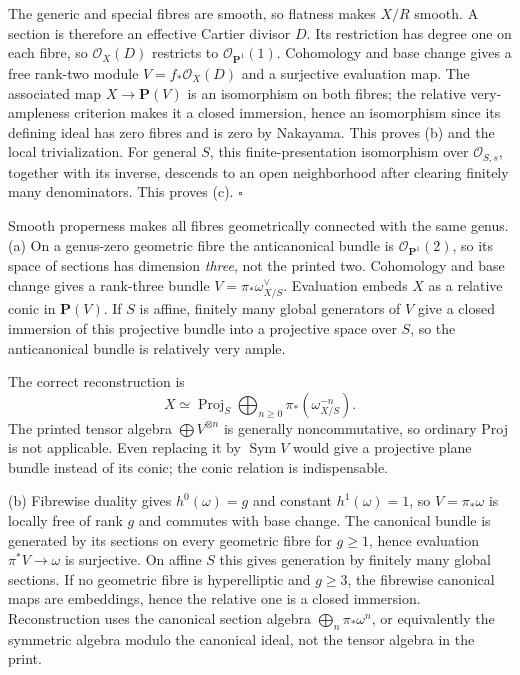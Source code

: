 \documentclass[11pt]{article}
\let\chapterexercise\exercise
\renewcommand{\exercise}[2]{\Needspace{8\baselineskip}\chapterexercise{#1}{#2}}
\begin{document}
The generic and special fibres are smooth, so flatness makes $X/R$ smooth. A section is therefore an effective Cartier divisor $D$. Its restriction has degree one on each fibre, so $\mathcal O_X(D)$ restricts to $\mathcal O_{\mathbf P^1}(1)$. Cohomology and base change gives a free rank-two module $V=f_*\mathcal O_X(D)$ and a surjective evaluation map. The associated map $X\to\mathbf P(V)$ is an isomorphism on both fibres; the relative very-ampleness criterion makes it a closed immersion, hence an isomorphism since its defining ideal has zero fibres and is zero by Nakayama. This proves (b) and the local trivialization. For general $S$, this finite-presentation isomorphism over $\mathcal O_{S,s}$, together with its inverse, descends to an open neighborhood after clearing finitely many denominators. This proves (c). \hfill$\square$

\pf
Smooth properness makes all fibres geometrically connected with the same genus. (a) On a genus-zero geometric fibre the anticanonical bundle is $\mathcal O_{\mathbf P^1}(2)$, so its space of sections has dimension \emph{three}, not the printed two. Cohomology and base change gives a rank-three bundle $V=\pi_*\omega_{X/S}^{\vee}$. Evaluation embeds $X$ as a relative conic in $\mathbf P(V)$. If $S$ is affine, finitely many global generators of $V$ give a closed immersion of this projective bundle into a projective space over $S$, so the anticanonical bundle is relatively very ample.

The correct reconstruction is
\[ X\simeq\operatorname{Proj}_S\bigoplus_{n\ge0}\pi_*(\omega_{X/S}^{-n}). \]
The printed tensor algebra $\bigoplus V^{\otimes n}$ is generally noncommutative, so ordinary Proj is not applicable. Even replacing it by $\operatorname{Sym}V$ would give a projective plane bundle instead of its conic; the conic relation is indispensable.

(b) Fibrewise duality gives $h^0(\omega)=g$ and constant $h^1(\omega)=1$, so $V=\pi_*\omega$ is locally free of rank $g$ and commutes with base change. The canonical bundle is generated by its sections on every geometric fibre for $g\ge1$, hence evaluation $\pi^*V\to\omega$ is surjective. On affine $S$ this gives generation by finitely many global sections. If no geometric fibre is hyperelliptic and $g\ge3$, the fibrewise canonical maps are embeddings, hence the relative one is a closed immersion. Reconstruction uses the canonical section algebra $\bigoplus_n\pi_*\omega^n$, or equivalently the symmetric algebra modulo the canonical ideal, not the tensor algebra in the print.
\end{document}
